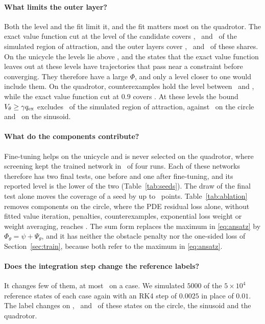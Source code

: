 \paragraph{What limits the outer layer?} Both the level and the fit limit it, and the fit matters most on the quadrotor. The exact value function cut at the level of the candidate covers \resCeilCirc, \resCeilSin\ and \resCeilQuad\ of the simulated region of attraction, and the outer layers cover \resCeilFracCirc, \resCeilFracSin\ and \resCeilFracQuad\ of these shares. On the unicycle the levels lie above \resCtwoMinSin, and the states that the exact value function leaves out at these levels have trajectories that pass near a constraint before converging. They therefore have a large $\Phi$, and only a level closer to one would include them. On the quadrotor, counterexamples hold the level between \resCtwoMinQuad\ and \resCtwoMaxQuad, while the exact value function cut at $0.9$ covers \resCeilNineQuad. At these levels the bound $V_\theta\ge\gamma q_{\mathrm{ex}}$ excludes \resFloorQuad\ of the simulated region of attraction, against \resFloorCirc\ on the circle and \resFloorSin\ on the sinusoid.

\paragraph{What do the components contribute?} Fine-tuning helps on the unicycle and is never selected on the quadrotor, where screening kept the trained network in \resKeptQuad\ of four runs. Each of these networks therefore has two final tests, one before and one after fine-tuning, and its reported level is the lower of the two (Table~\ref{tab:seeds}). The draw of the final test alone moves the coverage of a seed by up to \resDrawMaxQuad\ points. Table~\ref{tab:ablation} removes components on the circle, where the PDE residual loss alone, without fitted value iteration, penalties, counterexamples, exponential loss weight or weight averaging, reaches \resPinnCirc. The sum form replaces the maximum in \eqref{eq:ansatz} by $\Phi_\theta=\psi+\Psi_\theta$, and it has neither the obstacle penalty nor the one-sided loss of Section~\ref{sec:train}, because both refer to the maximum in \eqref{eq:ansatz}.

\paragraph{Does the integration step change the reference labels?} It changes few of them, at most \resRefNoiseMax\ on a case. We simulated $5000$ of the $5\times10^4$ reference states of each case again with an RK4 step of $0.0025$ in place of $0.01$. The label changes on \resRefNoiseCirc, \resRefNoiseSin\ and \resRefNoiseQuad\ of these states on the circle, the sinusoid and the quadrotor.

